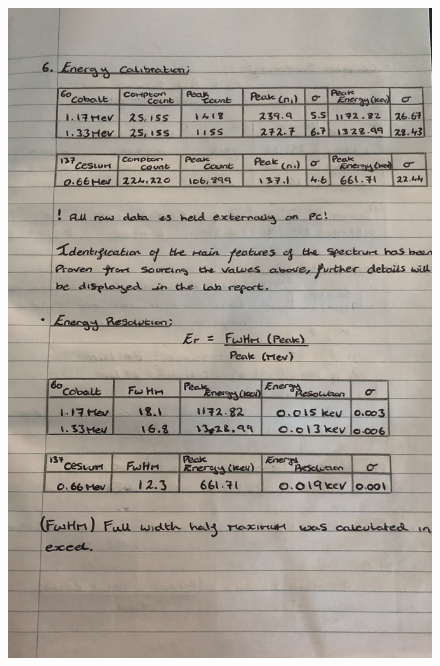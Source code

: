 \documentclass[12pt]{article}
\begin{document}
\begin{figure}[H]
\centering
\includegraphics[scale=0.175]{Images/IMG_0332.JPG}
\end{figure}
\newpage
\end{document}
